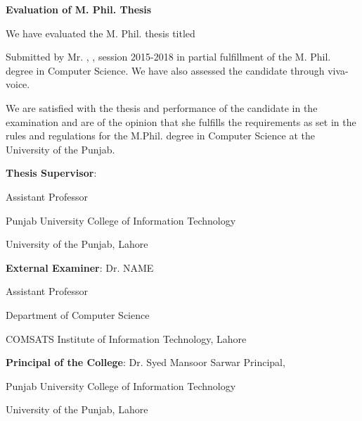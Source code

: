 
\begin{center}
    

\large{\textbf{Evaluation of M. Phil. Thesis}}
\end{center}

We have evaluated the M. Phil. thesis titled
\begin{center}
\textbf{ }
\end{center}

Submitted by Mr. \textbf{}, \textbf{}, session 2015-2018 in partial fulfillment of the M. Phil. degree in Computer Science. We have also assessed the candidate through viva-voice.

We are satisfied with the thesis and performance of the candidate in the examination and are of the opinion that she fulfills the requirements as set in the rules and regulations for the M.Phil. degree in Computer Science at the University of the Punjab.

\bigskip
\bigskip
 \textbf{Thesis Supervisor}:	\hfill {}

\hfill Assistant Professor

\hfill Punjab University College of Information Technology

\hfill University of the Punjab, Lahore


\bigskip

\bigskip
\textbf{External Examiner}: \hfill Dr. NAME

   \hfill Assistant Professor 

\hfill Department of Computer Science

  \hfill COMSATS Institute of Information Technology, Lahore


\bigskip

\bigskip
\textbf{Principal of the College}:  \hfill Dr. Syed Mansoor Sarwar
Principal, 

\hfill Punjab University College of Information Technology

\hfill University of the Punjab, Lahore
